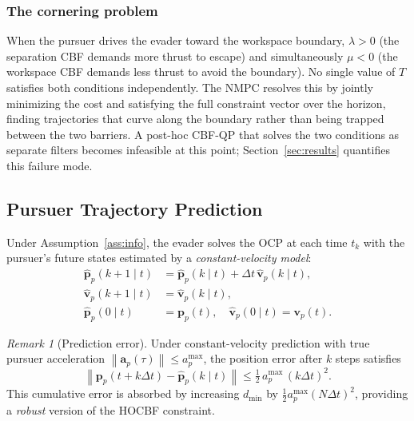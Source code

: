\documentclass[lettersize,journal]{IEEEtran}
\theoremstyle{definition}
\theoremstyle{remark}
\newtheorem{remark}{Remark}
\newcommand{\norm}[1]{\left\| #1 \right\|}
\newcommand{\vect}[1]{\bm{#1}}
\begin{document}
\subsubsection*{The cornering problem}
When the pursuer drives the evader toward the workspace boundary,
$\lambda > 0$ (the separation CBF demands more thrust to escape)
and simultaneously $\mu < 0$ (the workspace CBF demands less thrust
to avoid the boundary).
No single value of $T$ satisfies both conditions independently.
The NMPC resolves this by jointly minimizing the cost and satisfying
the full constraint vector over the horizon, finding trajectories
that curve along the boundary rather than being trapped between the
two barriers.
A post-hoc CBF-QP that solves the two conditions as separate filters
becomes infeasible at this point; Section~\ref{sec:results} quantifies
this failure mode.

\subsection{Pursuer Trajectory Prediction}
\label{sec:pursuer_pred}

Under Assumption~\ref{ass:info}, the evader solves the OCP at each
time $t_k$ with the pursuer's future states estimated by a
\emph{constant-velocity model}:
\begin{align}
    \hat{\vect{p}}_p(k+1 \mid t)
        &= \hat{\vect{p}}_p(k \mid t) + \Delta t\,\hat{\vect{v}}_p(k \mid t),
        \label{eq:pred_p} \\
    \hat{\vect{v}}_p(k+1 \mid t)
        &= \hat{\vect{v}}_p(k \mid t),
        \label{eq:pred_v} \\
    \hat{\vect{p}}_p(0 \mid t)
        &= \vect{p}_p(t),\quad
     \hat{\vect{v}}_p(0 \mid t) = \vect{v}_p(t).
        \label{eq:pred_ic}
\end{align}

\begin{remark}[Prediction error]
Under constant-velocity prediction with true pursuer acceleration
$\norm{\vect{a}_p(\tau)} \leq a_p^{\max}$, the position error after
$k$ steps satisfies
\begin{equation}
    \norm{\vect{p}_p(t + k\Delta t) - \hat{\vect{p}}_p(k\mid t)}
    \leq \tfrac{1}{2}\,a_p^{\max}\,(k\Delta t)^2.
    \label{eq:pred_error}
\end{equation}
This cumulative error is absorbed by increasing $d_{\min}$
by $\tfrac{1}{2}a_p^{\max}(N\Delta t)^2$, providing a
\emph{robust} version of the HOCBF constraint.
\end{remark}
\end{document}
